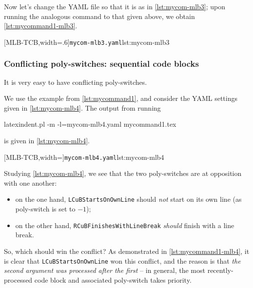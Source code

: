  \begin{example}
 Now let's change the YAML file so that it is as in \cref{lst:mycom-mlb3}; upon running
 the analogous command to that given above, we obtain \cref{lst:mycommand1-mlb3}.

 \begin{cmhtcbraster}[
   raster force size=false,
   raster column 1/.style={add to width=-1cm},
  ]
  [MLB-TCB,width=.6\textwidth]{\texttt{mycom-mlb3.yaml}}{lst:mycom-mlb3}
 \end{cmhtcbraster}
 \end{example}

\subsubsection{Conflicting poly-switches: sequential code blocks}
 It is very easy to have conflicting poly-switches.

 \begin{example}
 We use the example from \vref{lst:mycommand1}, and consider the YAML settings given in
 \cref{lst:mycom-mlb4}. The output from running 
  

 \begin{commandshell}
latexindent.pl -m -l=mycom-mlb4.yaml mycommand1.tex
\end{commandshell}

 is given in \cref{lst:mycom-mlb4}.

 \begin{cmhtcbraster}
  [MLB-TCB,width=\linewidth]{\texttt{mycom-mlb4.yaml}}{lst:mycom-mlb4}
 \end{cmhtcbraster}

 Studying \cref{lst:mycom-mlb4}, we see that the two poly-switches are at opposition with
 one another:
 \begin{itemize}
  \item on the one hand, \texttt{LCuBStartsOnOwnLine} should \emph{not} start on its own line (as
        poly-switch is set to $-1$);
  \item on the other hand, \texttt{RCuBFinishesWithLineBreak} \emph{should} finish with a line
        break.
 \end{itemize}
 So, which should win the conflict? As demonstrated in \cref{lst:mycommand1-mlb4}, it is
 clear that \texttt{LCuBStartsOnOwnLine} won this conflict, and the reason is that
 \emph{the second argument was processed after the first} -- in general, the most
 recently-processed code block and associated poly-switch takes priority.
 \end{example}


